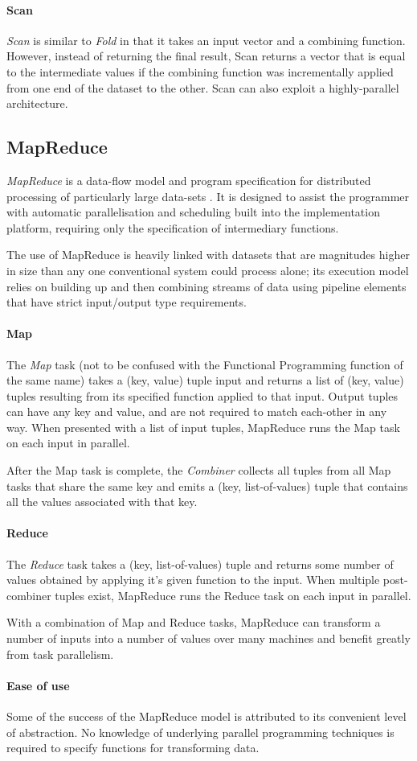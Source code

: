 \paragraph{Scan}
\emph{Scan} is similar to \emph{Fold} in that it takes an input vector and a combining function. However, instead of returning the final result, Scan returns a vector that is equal to the intermediate values if the combining function was incrementally applied from one end of the dataset to the other. Scan can also exploit a highly-parallel architecture.
\subsection{MapReduce}
\emph{MapReduce} is a data-flow model and program specification for distributed processing of particularly large data-sets \cite{mapreduce}. It is designed to assist the programmer with automatic parallelisation and scheduling built into the implementation platform, requiring only the specification of intermediary functions.

The use of MapReduce is heavily linked with datasets that are magnitudes higher in size than any one conventional system could process alone; its execution model relies on building up and then combining streams of data using pipeline elements that have strict input/output type requirements.
\paragraph{Map}
The \emph{Map} task (not to be confused with the Functional Programming function of the same name) takes a (key, value) tuple input and returns a list of (key, value) tuples resulting from its specified function applied to that input. Output tuples can have any key and value, and are not required to match each-other in any way. When presented with a list of input tuples, MapReduce runs the Map task on each input in parallel.

After the Map task is complete, the \emph{Combiner} collects all tuples from all Map tasks that share the same key and emits a (key, list-of-values) tuple that contains all the values associated with that key.
\paragraph{Reduce}
The \emph{Reduce} task takes a (key, list-of-values) tuple and returns some number of values obtained by applying it's given function to the input. When multiple post-combiner tuples exist, MapReduce runs the Reduce task on each input in parallel.

With a combination of Map and Reduce tasks, MapReduce can transform a number of inputs into a number of values over many machines and benefit greatly from task parallelism.

\paragraph{Ease of use}
Some of the success of the MapReduce model is attributed to its convenient level of abstraction. No knowledge of underlying parallel programming techniques is required to specify functions for transforming data.

